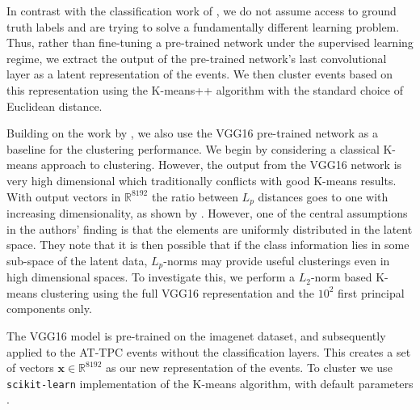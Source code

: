 \documentclass[review,number,sort&compress]{elsarticle}
\newcommand{\R}{\mathbb{R}}
\begin{document}

In contrast with the classification work of \citet{Kuchera2019}, we do not assume access to ground truth labels and are trying to solve a fundamentally different learning problem. Thus, rather than fine-tuning a pre-trained network under the supervised learning regime, we extract the output of the pre-trained network's last convolutional layer as a latent representation of the events. We then cluster events based on this representation using the K-means++ algorithm with the standard choice of Euclidean distance.

Building on the work by \citet{Kuchera2019}, we also use the VGG16 pre-trained network as a baseline for the clustering performance. We begin by considering a classical K-means approach to clustering. However, the output from the VGG16 network is very high dimensional which traditionally conflicts with good K-means results. With output vectors in $\R^{8192}$ the ratio between $L_p$ distances goes to one with increasing dimensionality, as shown by \citet{Aggarwal}. However, one of the central assumptions in the authors' finding is that the elements are uniformly distributed in the latent space. They note that it is then possible that if the class information lies in some sub-space of the latent data, $L_p$-norms may provide useful clusterings even in high dimensional spaces. To investigate this, we perform a $L_2$-norm based K-means clustering using the full VGG16 representation and the $10^2$ first principal components only. 


The VGG16 model is pre-trained on the imagenet dataset, and subsequently applied to the AT-TPC events without the classification layers. This creates a set of vectors $\boldsymbol{x} \in \R^{8192}$ as our new representation of the events. To cluster we use \lstinline{scikit-learn} implementation of the K-means algorithm, with default parameters \cite{Pedregosa2011}.
\end{document}
